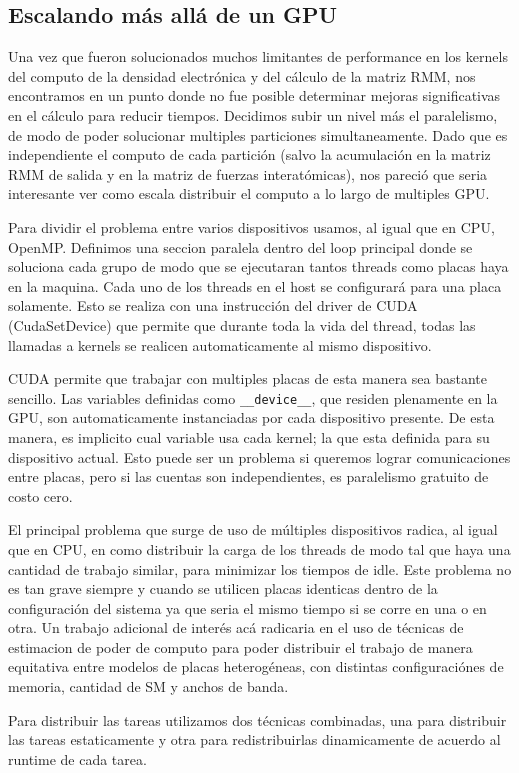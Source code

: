 \subsection{Escalando m\'as all\'a de un GPU}
Una vez que fueron solucionados muchos limitantes de performance en los kernels del computo
de la densidad electr\'onica y del c\'alculo de la matriz RMM, nos encontramos en un punto donde
no fue posible determinar mejoras significativas en el c\'alculo para reducir tiempos.
Decidimos subir un nivel m\'as el paralelismo, de modo de poder solucionar multiples particiones
simultaneamente. Dado que es independiente el computo de cada partici\'on (salvo la acumulaci\'on
en la matriz RMM de salida y en la matriz de fuerzas interat\'omicas), nos pareci\'o que seria
interesante ver como escala distribuir el computo a lo largo de multiples GPU.

Para dividir el problema entre varios dispositivos usamos, al igual que en CPU, OpenMP. Definimos
una seccion paralela dentro del loop principal donde se soluciona cada grupo de modo que se
ejecutaran tantos threads como placas haya en la maquina. Cada
uno de los threads en el host se configurar\'a para una placa solamente. Esto se realiza con
una instrucci\'on del driver de CUDA (CudaSetDevice) que permite que durante toda la vida del
thread, todas las llamadas a kernels se realicen automaticamente al mismo dispositivo.

CUDA permite que trabajar con multiples placas de esta manera sea bastante sencillo. Las variables
definidas como \texttt{\_\_device\_\_}, que residen plenamente en la GPU, son automaticamente instanciadas
por cada dispositivo presente. De esta manera, es implicito cual variable usa cada kernel; la que
esta definida para su dispositivo actual. Esto puede ser un problema si queremos lograr comunicaciones entre placas,
pero si las cuentas son independientes, es paralelismo gratuito de costo cero.

El principal problema que surge de uso de m\'ultiples dispositivos radica, al igual que en
CPU, en como distribuir la carga de los threads de modo tal que haya una cantidad de trabajo
similar, para minimizar los tiempos de idle. Este problema no es tan grave siempre y cuando
se utilicen placas identicas dentro de la configuraci\'on del sistema ya que seria
el mismo tiempo si se corre en una o en otra. Un trabajo adicional de inter\'es ac\'a
radicaria en el uso de t\'ecnicas de estimacion de poder de computo para poder
distribuir el trabajo de manera equitativa entre modelos de placas heterog\'eneas, con distintas
configuraci\'ones de memoria, cantidad de SM y anchos de banda.

Para distribuir las tareas utilizamos dos t\'ecnicas combinadas, una para distribuir las
tareas estaticamente y otra para redistribuirlas dinamicamente de acuerdo al runtime de
cada tarea.


